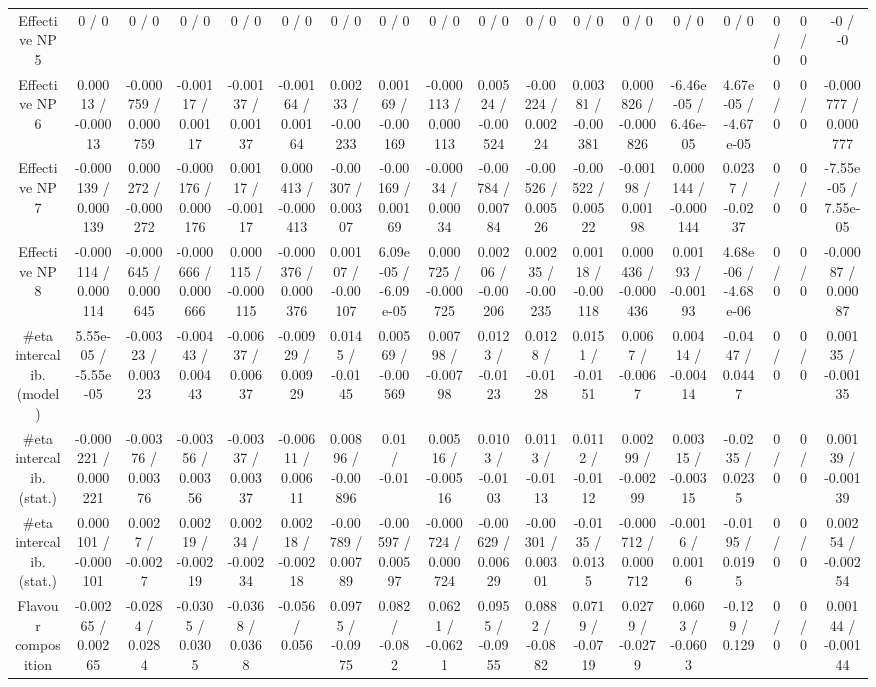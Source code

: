 \documentclass[10pt]{article}
\begin{document}
\begin{table}[htbp]
\begin{center}
\begin{tabular}{|c|c|c|c|c|c|c|c|c|c|c|c|c|c|c|c|c|c|}
  Effective NP 5 & 0 / 0 & 0 / 0 & 0 / 0 & 0 / 0 & 0 / 0 & 0 / 0 & 0 / 0 & 0 / 0 & 0 / 0 & 0 / 0 & 0 / 0 & 0 / 0 & 0 / 0 & 0 / 0 & 0 / 0 & 0 / 0 & -0 / -0 \\ 
  Effective NP 6 & 0.00013 / -0.00013 & -0.000759 / 0.000759 & -0.00117 / 0.00117 & -0.00137 / 0.00137 & -0.00164 / 0.00164 & 0.00233 / -0.00233 & 0.00169 / -0.00169 & -0.000113 / 0.000113 & 0.00524 / -0.00524 & -0.00224 / 0.00224 & 0.00381 / -0.00381 & 0.000826 / -0.000826 & -6.46e-05 / 6.46e-05 & 4.67e-05 / -4.67e-05 & 0 / 0 & 0 / 0 & -0.000777 / 0.000777 \\ 
  Effective NP 7 & -0.000139 / 0.000139 & 0.000272 / -0.000272 & -0.000176 / 0.000176 & 0.00117 / -0.00117 & 0.000413 / -0.000413 & -0.00307 / 0.00307 & -0.00169 / 0.00169 & -0.00034 / 0.00034 & -0.00784 / 0.00784 & -0.00526 / 0.00526 & -0.00522 / 0.00522 & -0.00198 / 0.00198 & 0.000144 / -0.000144 & 0.0237 / -0.0237 & 0 / 0 & 0 / 0 & -7.55e-05 / 7.55e-05 \\ 
  Effective NP 8 & -0.000114 / 0.000114 & -0.000645 / 0.000645 & -0.000666 / 0.000666 & 0.000115 / -0.000115 & -0.000376 / 0.000376 & 0.00107 / -0.00107 & 6.09e-05 / -6.09e-05 & 0.000725 / -0.000725 & 0.00206 / -0.00206 & 0.00235 / -0.00235 & 0.00118 / -0.00118 & 0.000436 / -0.000436 & 0.00193 / -0.00193 & 4.68e-06 / -4.68e-06 & 0 / 0 & 0 / 0 & -0.00087 / 0.00087 \\ 
  #eta intercalib. (model) & 5.55e-05 / -5.55e-05 & -0.00323 / 0.00323 & -0.00443 / 0.00443 & -0.00637 / 0.00637 & -0.00929 / 0.00929 & 0.0145 / -0.0145 & 0.00569 / -0.00569 & 0.00798 / -0.00798 & 0.0123 / -0.0123 & 0.0128 / -0.0128 & 0.0151 / -0.0151 & 0.0067 / -0.0067 & 0.00414 / -0.00414 & -0.0447 / 0.0447 & 0 / 0 & 0 / 0 & 0.00135 / -0.00135 \\ 
  #eta intercalib. (stat.) & -0.000221 / 0.000221 & -0.00376 / 0.00376 & -0.00356 / 0.00356 & -0.00337 / 0.00337 & -0.00611 / 0.00611 & 0.00896 / -0.00896 & 0.01 / -0.01 & 0.00516 / -0.00516 & 0.0103 / -0.0103 & 0.0113 / -0.0113 & 0.0112 / -0.0112 & 0.00299 / -0.00299 & 0.00315 / -0.00315 & -0.0235 / 0.0235 & 0 / 0 & 0 / 0 & 0.00139 / -0.00139 \\ 
  #eta intercalib. (stat.) & 0.000101 / -0.000101 & 0.0027 / -0.0027 & 0.00219 / -0.00219 & 0.00234 / -0.00234 & 0.00218 / -0.00218 & -0.00789 / 0.00789 & -0.00597 / 0.00597 & -0.000724 / 0.000724 & -0.00629 / 0.00629 & -0.00301 / 0.00301 & -0.0135 / 0.0135 & -0.000712 / 0.000712 & -0.0016 / 0.0016 & -0.0195 / 0.0195 & 0 / 0 & 0 / 0 & 0.00254 / -0.00254 \\ 
  Flavour composition & -0.00265 / 0.00265 & -0.0284 / 0.0284 & -0.0305 / 0.0305 & -0.0368 / 0.0368 & -0.056 / 0.056 & 0.0975 / -0.0975 & 0.082 / -0.082 & 0.0621 / -0.0621 & 0.0955 / -0.0955 & 0.0882 / -0.0882 & 0.0719 / -0.0719 & 0.0279 / -0.0279 & 0.0603 / -0.0603 & -0.129 / 0.129 & 0 / 0 & 0 / 0 & 0.00144 / -0.00144 \\ 

\end{tabular}
\end{center}
\end{table}
\end{document}

